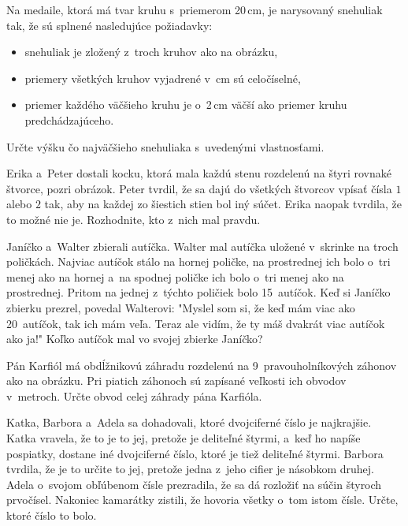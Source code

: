 {%
Na medaile, ktorá má tvar kruhu s~priemerom 20\,cm,
je narysovaný snehuliak tak, že sú
splnené nasledujúce požiadavky:
\begin{itemize}
  \item snehuliak je zložený z~troch kruhov ako na obrázku,
  \item priemery všetkých kruhov vyjadrené v~cm sú celočíselné,
  \item priemer každého väčšieho kruhu je o~2\,cm väčší ako priemer
    kruhu predchádzajúceho.
\end{itemize}
Určte výšku čo najväčšieho snehuliaka s~uvedenými vlastnosťami.
%
}

{%
Erika a~Peter dostali kocku, ktorá mala každú stenu rozdelenú na štyri
rovnaké štvorce, pozri obrázok.
Peter tvrdil, že sa dajú do všetkých štvorcov vpísať čísla $1$ alebo $2$ tak, aby na
každej zo šiestich stien bol iný súčet.
Erika naopak tvrdila, že to možné nie je.
Rozhodnite, kto z~nich mal pravdu.
%
}

{%
Janíčko a~Walter zbierali autíčka.
Walter mal autíčka uložené v~skrinke na troch poličkách.
Najviac autíčok stálo na hornej poličke, na prostrednej ich bolo o~tri menej
ako na hornej a~na spodnej poličke ich bolo o~tri menej ako na prostrednej.
Pritom na jednej z~týchto poličiek bolo 15~autíčok.
Keď si Janíčko zbierku prezrel, povedal Walterovi: "Myslel som si, že keď mám viac ako 20~autíčok, tak ich mám veľa.
Teraz ale vidím, že ty máš dvakrát viac autíčok ako ja!"
Koľko autíčok mal vo svojej zbierke Janíčko?
}

{%
Pán Karfiól má obdĺžnikovú záhradu rozdelenú na 9~pravouholníkových
záhonov ako na obrázku.
Pri piatich záhonoch sú zapísané veľkosti ich obvodov v~metroch.
Určte obvod celej záhrady pána Karfióla.
%
}

{%
Katka, Barbora a~Adela sa dohadovali, ktoré dvojciferné číslo je najkrajšie.
Katka vravela, že to je to jej, pretože je deliteľné štyrmi, a~keď ho
napíše pospiatky, dostane iné dvojciferné číslo, ktoré je tiež deliteľné
štyrmi.
Barbora tvrdila, že je to určite to jej, pretože jedna z~jeho cifier je
násobkom druhej.
Adela o~svojom obľúbenom čísle prezradila, že sa dá rozložiť na súčin štyroch
prvočísel.
Nakoniec kamarátky zistili, že hovoria všetky o~tom istom čísle.
Určte, ktoré číslo to bolo.}

